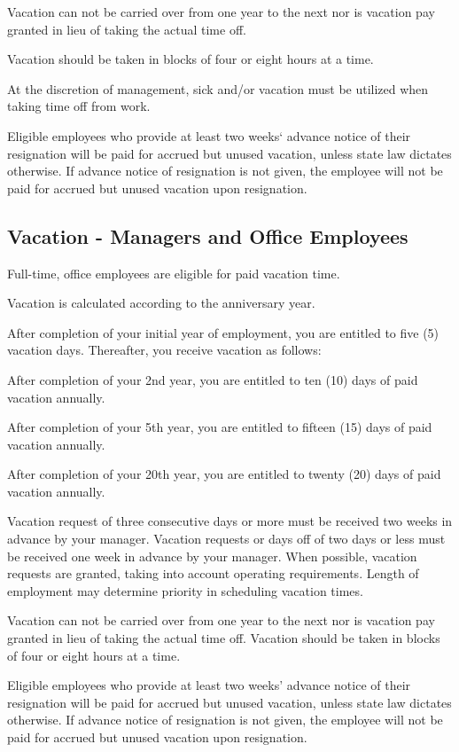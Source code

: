 \documentclass{book}
\begin{document}
Vacation can not be carried over from one year to the next nor is vacation pay granted in lieu of taking the actual time off.

Vacation should be taken in blocks of four or eight hours at a time.

At the discretion of management, sick and/or vacation must be utilized when taking time off from work.

Eligible employees who provide at least two weeks‘ advance notice of their resignation will be paid for accrued but unused vacation, unless state law dictates otherwise. If advance notice of resignation is not given, the employee will not be paid for accrued but unused vacation upon resignation.

\subsection{Vacation - Managers and Office Employees}

Full-time, office employees are eligible for paid vacation time.

Vacation is calculated according to the anniversary year.

After completion of your initial year of employment, you are entitled to five (5) vacation days. Thereafter, you receive vacation as follows:

After completion of your 2nd year, you are entitled to ten (10) days of paid vacation annually.

After completion of your 5th year, you are entitled to fifteen (15) days of paid vacation annually.

After completion of your 20th year, you are entitled to twenty (20) days of paid vacation annually.

Vacation request of three consecutive days or more must be received two weeks in advance by your manager. Vacation requests or days off of two days or less must be received one week in advance by your manager. When possible, vacation requests are granted, taking into account operating requirements. Length of employment may determine priority in scheduling vacation times.

Vacation can not be carried over from one year to the next nor is vacation pay granted in lieu of taking the actual time off. Vacation should be taken in blocks of four or eight hours at a time.

Eligible employees who provide at least two weeks’ advance notice of their resignation will be paid for accrued but unused vacation, unless state law dictates otherwise. If advance notice of resignation is not given, the employee will not be paid for accrued but unused vacation upon resignation.
\end{document}
